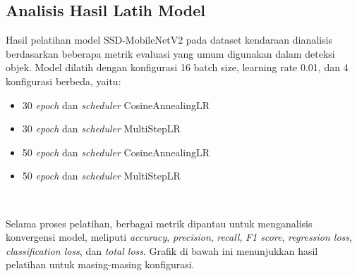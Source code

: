 \subsection{Analisis Hasil Latih Model}

Hasil pelatihan model SSD-MobileNetV2 pada dataset kendaraan dianalisis berdasarkan beberapa metrik evaluasi yang umum digunakan dalam deteksi objek. Model dilatih dengan konfigurasi 16 batch size, learning rate 0.01, dan 4 konfigurasi berbeda, yaitu:

\begin{itemize}[nolistsep]
  \item 30 \emph{epoch} dan \emph{scheduler} CosineAnnealingLR
  \item 30 \emph{epoch} dan \emph{scheduler} MultiStepLR
  \item 50 \emph{epoch} dan \emph{scheduler} CosineAnnealingLR
  \item 50 \emph{epoch} dan \emph{scheduler} MultiStepLR
\end{itemize}\

Selama proses pelatihan, berbagai metrik dipantau untuk menganalisis konvergensi model, meliputi \emph{accuracy}, \emph{precision}, \emph{recall}, \emph{F1 score}, \emph{regression loss}, \emph{classification loss}, dan \emph{total loss}. Grafik di bawah ini menunjukkan hasil pelatihan untuk masing-masing konfigurasi.

